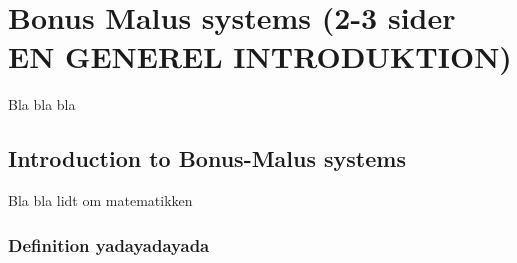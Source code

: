 
\chapter{Bonus Malus systems (2-3 sider EN GENEREL INTRODUKTION)}
\label{chap:bonusmalus}

Bla bla bla

\section{Introduction to Bonus-Malus systems}
\label{sec:intro_bonusmalus}
Bla bla lidt om matematikken
\subsection{Definition yadayadayada}
\label{sec:intro_coffee_beans}

